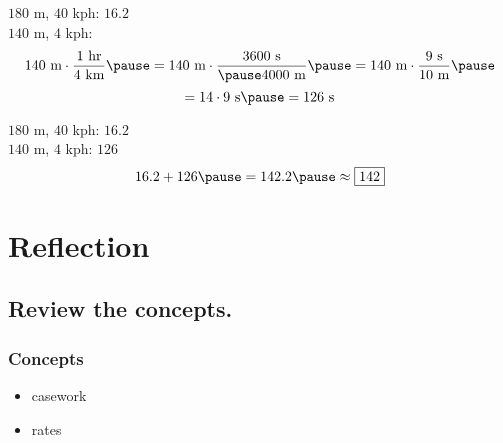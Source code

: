 \documentclass{beamer} %
\begin{document}
\begin{frame}
  $180$ m, $40$ kph: $16.2$ \pause
  \[\]
  $140$ m, $4$ kph: \pause
  \[140 \text{ m} \cdot \frac{1 \text{ hr}}{4 \text{ km}} \pause = 140 \text{ m} \cdot \frac{3600 \text{ s}}{\pause 4000 \text{ m}} \pause = 140 \text{ m} \cdot \frac{9 \text{ s}}{10 \text{ m}} \pause\]
  \[= 14 \cdot 9 \text{ s} \pause = 126 \text{ s}\]
\end{frame}

\begin{frame}
  $180$ m, $40$ kph: $16.2$
  \[\]
  $140$ m, $4$ kph: $126$ \pause
  \[16.2 + 126 \pause = 142.2 \pause \approx \boxed{142}\]
\end{frame}

\setcounter{equation}{0} %

\section{Reflection}

\subsection*{Review the concepts.}

\begin{frame}
  \frametitle{Concepts}
  \pause
  \begin{itemize}
    \item casework \pause
    \item rates
  \end{itemize}
\end{frame}

\begin{comment}
\subsection*{This is Tim.}

\tcbset{colframe=ml3}
\begin{frame}
  \begin{center}
    \begin{figure}
      \tcbox{\texttt{[image: sanders.png]}}
      ``Hi everybody, this is Tim.''
    \end{figure}
  \end{center}
\end{frame}
\end{comment}
\end{document}
